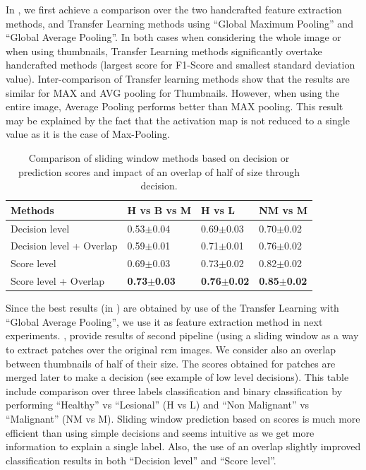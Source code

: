 In , we first achieve a comparison over the two handcrafted feature extraction methods, and Transfer Learning methods using “Global Maximum Pooling” and “Global Average Pooling”. In both cases when considering the whole image or when using thumbnails, Transfer Learning methods significantly overtake handcrafted methods (largest score for F1-Score and smallest standard deviation value). Inter-comparison of Transfer learning methods show that the results are similar for MAX and AVG pooling for Thumbnails. However,  when using the entire image, Average Pooling performs better than MAX pooling. This result may be explained by the fact that the activation map is not reduced to a single value as it is the case of Max-Pooling. \par
\begin{table}[h]
\centering
    \begin{tabular*}{\linewidth}{l@{\extracolsep{\fill}}lll}
        \hline
        \textbf{Methods} & \textbf{H vs B vs M} & \textbf{H vs L} & \textbf{NM vs M}\\
        \hline
        Decision level& 0.53$\pm$0.04 & 0.69$\pm$0.03 & 0.70$\pm$0.02\\
        \hline
        Decision level + Overlap & 0.59$\pm$0.01 & 0.71$\pm$0.01 & 0.76$\pm$0.02\\
        \hline
        Score level& 0.69$\pm$0.03 & 0.73$\pm$0.02 & 0.82$\pm$0.02\\
        \hline
        Score level + Overlap & \textbf{0.73$\pm$0.03} & \textbf{0.76$\pm$0.02} & \textbf{0.85$\pm$0.02}\\
    \end{tabular*}
    \caption{Comparison of sliding window methods based on decision or prediction scores and impact of an overlap of half of size through decision.}
    \label{sliding_scores}
\end{table}
Since the best results (in ) are obtained by use of the Transfer Learning with “Global Average Pooling”, we use it as feature extraction method in next experiments. , provide results of second pipeline (using a sliding window as a way to extract patches over the original \ac{rcm} images. We consider also an overlap between thumbnails of half of their size. The scores obtained for patches are merged later to make a decision (see  example of low level decisions). This table include comparison over three labels classification and binary classification by performing “Healthy” vs “Lesional” (H vs L) and “Non Malignant” vs “Malignant” (NM vs M). Sliding window prediction based on scores is much more efficient than using simple decisions and seems intuitive as we get more information to explain a single label. Also, the use of an overlap slightly improved classification results in both “Decision level” and “Score level”.\par
